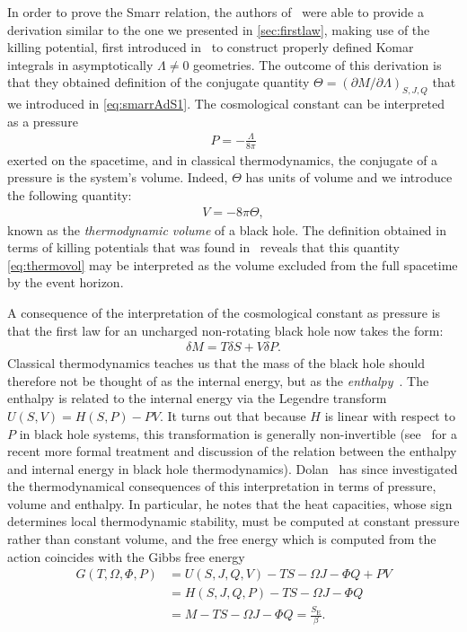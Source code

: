 \documentclass[
twoside,
openright,
frontopenright
]{dmathesis}
\newcommand{\nn}{\nonumber}
\begin{document}
In order to prove the Smarr relation, the authors of~\cite{Kastor:2009wy} were
able to provide a derivation similar to the one we presented in
\cref{sec:firstlaw}, making use of the killing potential, first introduced
in~\cite{Bazanski:1990qd,Kastor:2008xb} to construct properly defined Komar
integrals in asymptotically $\Lambda\neq 0$ geometries. The outcome of this
derivation is that they obtained definition of the conjugate quantity
$\Theta = (\partial M/\partial \Lambda)_{S,J,Q}$ that we introduced in
\cref{eq:smarrAdS1}. The cosmological constant can be interpreted as a pressure
\begin{align}
  P = -\frac{\Lambda}{8\pi}
\end{align}
exerted on the spacetime, and in classical thermodynamics, the conjugate of a
pressure is the system's volume. Indeed, $\Theta$ has units of volume and we
introduce the following quantity:
\begin{align}
  \label{eq:thermovol}
  V=-8\pi\Theta,
\end{align}
known as the \emph{thermodynamic volume} of a black hole. The definition
obtained in terms of killing potentials that was found in~\cite{Kastor:2009wy}
reveals that this quantity \eqref{eq:thermovol} may be interpreted as the volume
excluded from the full spacetime by the event horizon.

A consequence of the interpretation of the cosmological constant as pressure is
that the first law for an uncharged non-rotating black hole now takes the form:
\begin{align}
  \delta M = T\delta S + V\delta P.
\end{align}
Classical thermodynamics teaches us that the mass of the black hole should
therefore not be thought of as the internal energy, but as the
\emph{enthalpy}~\cite{Kastor:2009wy}. The enthalpy is related to the internal
energy via the Legendre transform $U(S,V) = H(S,P) - PV$. It turns out that
because $H$ is linear with respect to $P$ in black hole systems, this
transformation is generally non-invertible (see~\cite{Baldiotti:2017ywq} for a
recent more formal treatment and discussion of the relation between the enthalpy
and internal energy in black hole
thermodynamics). Dolan~\cite{Dolan:2010ha,Dolan:2011xt} has since investigated
the thermodynamical consequences of this interpretation in terms of pressure,
volume and enthalpy. In particular, he notes that the heat capacities, whose
sign determines local thermodynamic stability, must be computed at constant
pressure rather than constant volume, and the free energy which is computed from
the action coincides with the Gibbs free energy
\begin{align}
  G(T,\Omega,\Phi,P) &= U(S,J,Q,V) - TS - \Omega J - \Phi Q + PV\nn\\
                     &= H(S,J,Q,P) - TS -\Omega J -\Phi Q\nn\\
                     &= M - TS - \Omega J - \Phi Q = \frac{S_\mathrm{E}}{\beta}.
\end{align}
\end{document}
